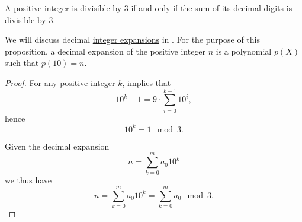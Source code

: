 \begin{proposition}\label{thm:division_by_three_digits}
  A positive integer is divisible by \( 3 \) if and only if the sum of its \hyperref[def:positional_number_system/decimal]{decimal digits} is divisible by \( 3 \).
\end{proposition}
\begin{comments}
  \item We will discuss decimal \hyperref[def:nonnegative_integer_radix_expansion]{integer expansions} in . For the purpose of this proposition, a decimal expansion of the positive integer \( n \) is a polynomial \( p(X) \) such that \( p(10) = n \).
\end{comments}
\begin{proof}
  For any positive integer \( k \),  implies that
  \begin{equation*}
    10^k - 1 = 9 \cdot \sum_{i=0}^{k-1} 10^i,
  \end{equation*}
  hence
  \begin{equation*}
    10^k = 1 \mod 3.
  \end{equation*}

  Given the decimal expansion
  \begin{equation*}
    n = \sum_{k=0}^m a_0 10^k
  \end{equation*}
  we thus have
  \begin{equation*}
    n = \sum_{k=0}^m a_0 10^k = \sum_{k=0}^m a_0 \mod 3.
  \end{equation*}
\end{proof}

